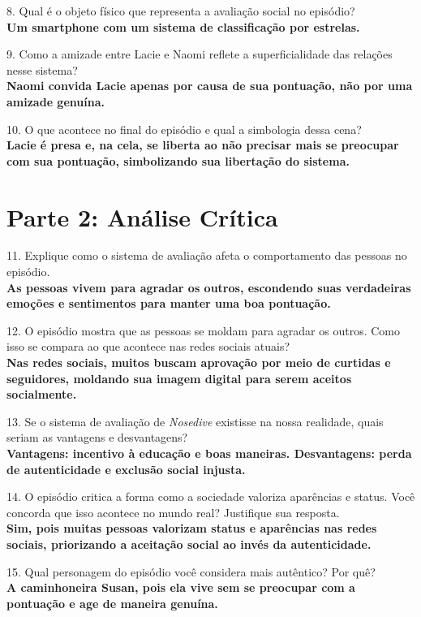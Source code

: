 \documentclass[11pt]{article}
\begin{document}
\begin{multicols}{2}
8. Qual é o objeto físico que representa a avaliação social no episódio?\\
\textbf{Um smartphone com um sistema de classificação por estrelas.}

9. Como a amizade entre Lacie e Naomi reflete a superficialidade das relações nesse sistema?\\
\textbf{Naomi convida Lacie apenas por causa de sua pontuação, não por uma amizade genuína.}

10. O que acontece no final do episódio e qual a simbologia dessa cena?\\
\textbf{Lacie é presa e, na cela, se liberta ao não precisar mais se preocupar com sua pontuação, simbolizando sua libertação do sistema.}

\section*{Parte 2: An\'alise Cr\'itica}

11. Explique como o sistema de avaliação afeta o comportamento das pessoas no episódio.\\
\textbf{As pessoas vivem para agradar os outros, escondendo suas verdadeiras emoções e sentimentos para manter uma boa pontuação.}

12. O episódio mostra que as pessoas se moldam para agradar os outros. Como isso se compara ao que acontece nas redes sociais atuais?\\
\textbf{Nas redes sociais, muitos buscam aprovação por meio de curtidas e seguidores, moldando sua imagem digital para serem aceitos socialmente.}

13. Se o sistema de avaliação de \textit{Nosedive} existisse na nossa realidade, quais seriam as vantagens e desvantagens?\\
\textbf{Vantagens: incentivo à educação e boas maneiras. Desvantagens: perda de autenticidade e exclusão social injusta.}

14. O episódio critica a forma como a sociedade valoriza aparências e status. Você concorda que isso acontece no mundo real? Justifique sua resposta.\\
\textbf{Sim, pois muitas pessoas valorizam status e aparências nas redes sociais, priorizando a aceitação social ao invés da autenticidade.}

15. Qual personagem do episódio você considera mais autêntico? Por quê?\\
\textbf{A caminhoneira Susan, pois ela vive sem se preocupar com a pontuação e age de maneira genuína.}


\end{multicols}
\end{document}
